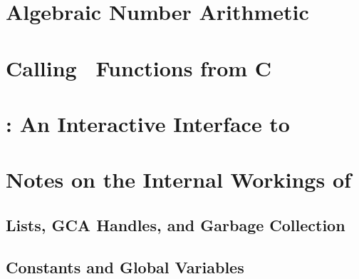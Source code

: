 \documentclass{report}
\begin{document}
\chapter{Algebraic Number Arithmetic}
\label{c:AN}




\appendix
\clearpage
\chapter{Calling \saclib\ Functions from C}
\label{c:CFC}




\chapter{\isac: An Interactive Interface to \saclib}
\label{c:ISAC}




\chapter{Notes on the Internal Workings of \saclib}
\label{c:NIW}

\section{Lists, GCA Handles, and Garbage Collection}
\label{c:NIW s:GC}



\section{Constants and Global Variables}
\label{c:NIW s:CGV}




%
%


%
%

\clearpage
{}
\printindex
\end{document}
